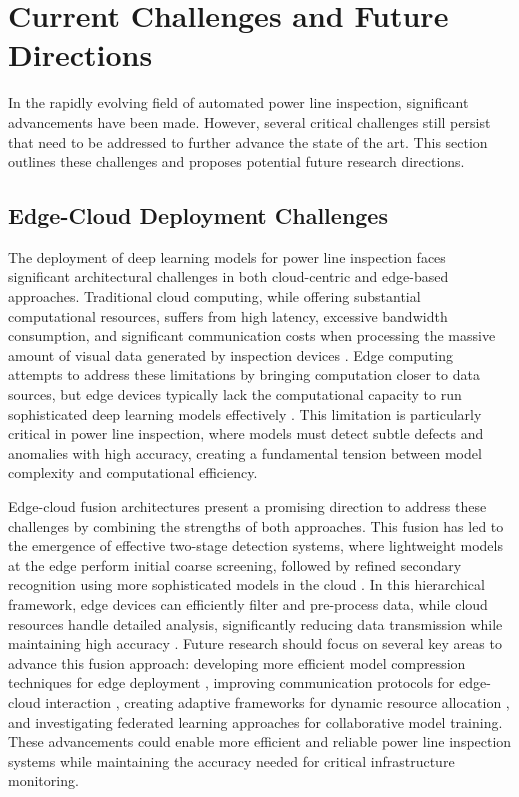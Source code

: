 \section{Current Challenges and Future Directions}\label{sec:challenges}
In the rapidly evolving field of automated power line inspection, significant advancements have been made. However, several critical challenges still persist that need to be addressed to further advance the state of the art. This section outlines these challenges and proposes potential future research directions.

\subsection{Edge-Cloud Deployment Challenges}
The deployment of deep learning models for power line inspection faces significant architectural challenges in both cloud-centric and edge-based approaches. Traditional cloud computing, while offering substantial computational resources, suffers from high latency, excessive bandwidth consumption, and significant communication costs when processing the massive amount of visual data generated by inspection devices \cite{wang2020convergence, wei_online_2022}. Edge computing attempts to address these limitations by bringing computation closer to data sources, but edge devices typically lack the computational capacity to run sophisticated deep learning models effectively \cite{shi2016edge}. This limitation is particularly critical in power line inspection, where models must detect subtle defects and anomalies with high accuracy, creating a fundamental tension between model complexity and computational efficiency.

Edge-cloud fusion architectures present a promising direction to address these challenges by combining the strengths of both approaches. This fusion has led to the emergence of effective two-stage detection systems, where lightweight models at the edge perform initial coarse screening, followed by refined secondary recognition using more sophisticated models in the cloud \cite{wei_online_2022}. In this hierarchical framework, edge devices can efficiently filter and pre-process data, while cloud resources handle detailed analysis, significantly reducing data transmission while maintaining high accuracy \cite{wei_online_2022, zhang_edge_2023, zhang_cloud_edge_2020}. Future research should focus on several key areas to advance this fusion approach: developing more efficient model compression techniques for edge deployment \cite{howard2017mobilenets}, improving communication protocols for edge-cloud interaction \cite{shi2016edge}, creating adaptive frameworks for dynamic resource allocation \cite{wang2020convergence}, and investigating federated learning \cite{mcmahan2017communication} approaches for collaborative model training. These advancements could enable more efficient and reliable power line inspection systems while maintaining the accuracy needed for critical infrastructure monitoring.

